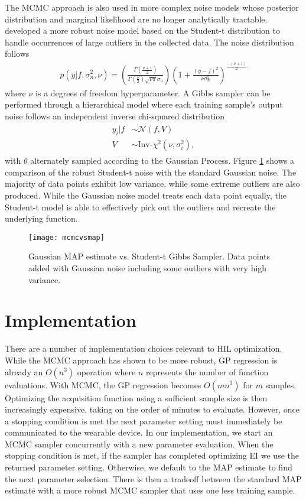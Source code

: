 The MCMC approach is also used in more complex noise models whose posterior distribution and marginal likelihood are no longer analytically tractable. \citet{NIPS2009_3806,Jylanki:2011:RGP:1953048.2078209} developed a more robust noise model based on the Student-t distribution to handle occurrences of large outliers in the collected data. The noise distribution follows
\begin{align}
p(y\vert f,\sigma_n^2,\nu) = (\frac{\Gamma (\frac{\nu + 1}{2})}{\Gamma(\frac{\nu}{2})\sqrt{\nu\pi}\sigma_n})(1 + \frac{(y-f)^2}{\nu\sigma_n^2})^{\frac{-(\nu + 1)}{2}}
\end{align} 
where $\nu$ is a degrees of freedom hyperparameter. A Gibbs sampler can be performed through a hierarchical model where each training sample's output noise follows an independent inverse chi-squared distribution
\begin{align}
\begin{split}
y_i\vert f &\sim \mathcal{N}(f, V)\\
V &\sim \text{Inv-}\chi^2(\nu, \sigma_i^2),
\end{split}
\end{align}
with $\theta$ alternately sampled according to the Gaussian Process. Figure \ref{fig:mcmcvsmap} shows a comparison of the robust Student-t noise with the standard Gaussian noise. The majority of data points exhibit low variance, while some extreme outliers are also produced. While the Gaussian noise model treats each data point equally, the Student-t model is able to effectively pick out the outliers and recreate the underlying function.

\begin{figure}[t]
\centering
\texttt{[image: mcmcvsmap]}
\caption{Gaussian MAP estimate vs. Student-t Gibbs Sampler. Data points added with Gaussian noise including some outliers with very high variance.}
\label{fig:mcmcvsmap}
\end{figure}

\section{Implementation}
There are a number of implementation choices relevant to HIL optimization. While the MCMC approach has shown to be more robust, GP regression is already an $O(n^3)$ operation where $n$ represents the number of function evaluations. With MCMC, the GP regression becomes $O(mn^3)$ for $m$ samples. Optimizing the acquisition function using a sufficient sample size is then increasingly expensive, taking on the order of minutes to evaluate. However, once a stopping condition is met the next parameter setting must immediately be communicated to the wearable device. In our implementation, we start an MCMC sampler concurrently with a new parameter evaluation. When the stopping condition is met, if the sampler has completed optimizing EI we use the returned parameter setting. Otherwise, we default to the MAP estimate to find the next parameter selection. There is then a tradeoff between the standard MAP estimate with a more robust MCMC sampler that uses one less training sample.

